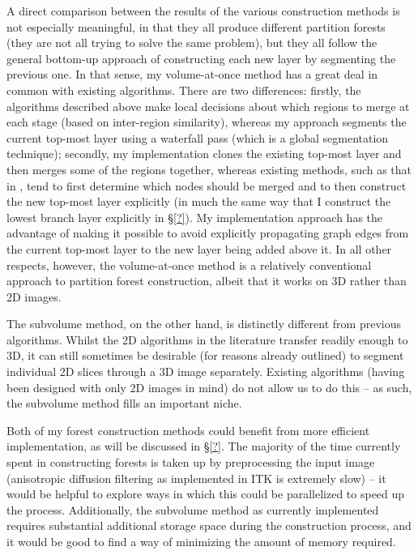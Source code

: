 A direct comparison between the results of the various construction methods is not especially meaningful, in that they all produce different partition forests (they are not all trying to solve the same problem), but they all follow the general bottom-up approach of constructing each new layer by segmenting the previous one. In that sense, my volume-at-once method has a great deal in common with existing algorithms. There are two differences: firstly, the algorithms described above make local decisions about which regions to merge at each stage (based on inter-region similarity), whereas my approach segments the current top-most layer using a waterfall pass (which is a global segmentation technique); secondly, my implementation clones the existing top-most layer and then merges some of the regions together, whereas existing methods, such as that in \cite{yu02}, tend to first determine which nodes should be merged and to then construct the new top-most layer explicitly (in much the same way that I construct the lowest branch layer explicitly in \S\ref{?}). My implementation approach has the advantage of making it possible to avoid explicitly propagating graph edges from the current top-most layer to the new layer being added above it. In all other respects, however, the volume-at-once method is a relatively conventional approach to partition forest construction, albeit that it works on 3D rather than 2D images.

The subvolume method, on the other hand, is distinctly different from previous algorithms. Whilst the 2D algorithms in the literature transfer readily enough to 3D, it can still sometimes be desirable (for reasons already outlined) to segment individual 2D slices through a 3D image separately. Existing algorithms (having been designed with only 2D images in mind) do not allow us to do this -- as such, the subvolume method fills an important niche.

Both of my forest construction methods could benefit from more efficient implementation, as will be discussed in \S\ref{?}. The majority of the time currently spent in constructing forests is taken up by preprocessing the input image (anisotropic diffusion filtering as implemented in ITK is extremely slow) -- it would be helpful to explore ways in which this could be parallelized to speed up the process. Additionally, the subvolume method as currently implemented requires substantial additional storage space during the construction process, and it would be good to find a way of minimizing the amount of memory required.


